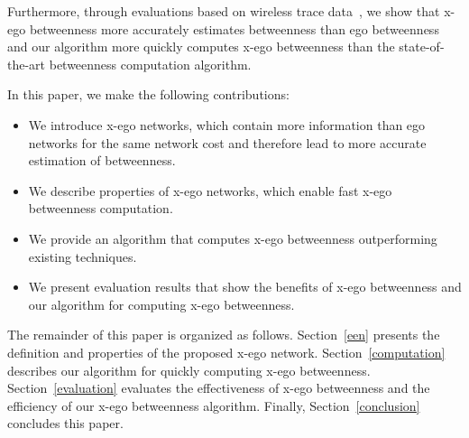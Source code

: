 Furthermore, through evaluations based on wireless trace data~\cite{cambridge-haggle-2009-05-29}, we show that x-ego betweenness more accurately estimates betweenness than ego betweenness and our algorithm more quickly computes x-ego betweenness than the state-of-the-art betweenness computation algorithm.

In this paper, we make the following contributions:
\begin{itemize}
  \item We introduce x-ego networks, which contain more information than ego networks for the same network cost and therefore lead to more accurate estimation of betweenness.
  \item We describe properties of x-ego networks, which enable fast x-ego betweenness computation.
  \item We provide an algorithm that computes x-ego betweenness outperforming existing techniques.
  \item We present evaluation results that show the benefits of x-ego betweenness and our algorithm for computing x-ego betweenness.
\end{itemize}

The remainder of this paper is organized as follows. 
Section~\ref{een} presents the definition and properties of the proposed x-ego network. 
Section~\ref{computation} describes our algorithm for quickly computing x-ego betweenness.
Section~\ref{evaluation} evaluates the effectiveness of x-ego betweenness and the efficiency of our x-ego betweenness algorithm.
Finally, Section~\ref{conclusion} concludes this paper.